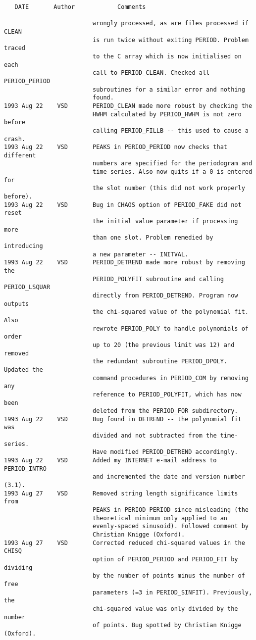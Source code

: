 \newpage


\begin{verbatim}
   DATE       Author            Comments

                         wrongly processed, as are files processed if CLEAN
                         is run twice without exiting PERIOD. Problem traced
                         to the C array which is now initialised on each
                         call to PERIOD_CLEAN. Checked all PERIOD_PERIOD
                         subroutines for a similar error and nothing
                         found.
1993 Aug 22    VSD       PERIOD_CLEAN made more robust by checking the
                         HWHM calculated by PERIOD_HWHM is not zero before
                         calling PERIOD_FILLB -- this used to cause a crash.
1993 Aug 22    VSD       PEAKS in PERIOD_PERIOD now checks that different
                         numbers are specified for the periodogram and
                         time-series. Also now quits if a 0 is entered for
                         the slot number (this did not work properly before).
1993 Aug 22    VSD       Bug in CHAOS option of PERIOD_FAKE did not reset
                         the initial value parameter if processing more
                         than one slot. Problem remedied by introducing
                         a new parameter -- INITVAL.
1993 Aug 22    VSD       PERIOD_DETREND made more robust by removing the
                         PERIOD_POLYFIT subroutine and calling PERIOD_LSQUAR
                         directly from PERIOD_DETREND. Program now outputs
                         the chi-squared value of the polynomial fit. Also
                         rewrote PERIOD_POLY to handle polynomials of order
                         up to 20 (the previous limit was 12) and removed
                         the redundant subroutine PERIOD_DPOLY. Updated the
                         command procedures in PERIOD_COM by removing any
                         reference to PERIOD_POLYFIT, which has now been
                         deleted from the PERIOD_FOR subdirectory.
1993 Aug 22    VSD       Bug found in DETREND -- the polynomial fit was
                         divided and not subtracted from the time-series.
                         Have modified PERIOD_DETREND accordingly.
1993 Aug 22    VSD       Added my INTERNET e-mail address to PERIOD_INTRO
                         and incremented the date and version number (3.1).
1993 Aug 27    VSD       Removed string length significance limits from
                         PEAKS in PERIOD_PERIOD since misleading (the
                         theoretical minimum only applied to an
                         evenly-spaced sinusoid). Followed comment by
                         Christian Knigge (Oxford).
1993 Aug 27    VSD       Corrected reduced chi-squared values in the CHISQ
                         option of PERIOD_PERIOD and PERIOD_FIT by dividing
                         by the number of points minus the number of free
                         parameters (=3 in PERIOD_SINFIT). Previously, the
                         chi-squared value was only divided by the number
                         of points. Bug spotted by Christian Knigge (Oxford).


\end{verbatim}
